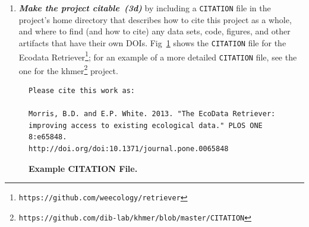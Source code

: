 \documentclass[10pt,letterpaper]{article}
\newcommand{\withurl}[2]{{#1}\footnote{{\texttt{#2}}}}
\newcommand{\practice}[2]{\textbf{\emph{{#2}~({#1})}}}
\begin{document}
\begin{enumerate}
  We recommend Creative Commons licenses for data and text, either
  \withurl{CC-0}{https://creativecommons.org/about/cc0/} (the ``No
  Rights Reserved'' license) or
  \withurl{CC-BY}{https://creativecommons.org/licenses/by/4.0/} (the
  ``Attribution'' license, which sharing and reuse but requires people
  to give appropriate credit to the creators).  For software, we
  recommend a permissive license such as the MIT, BSD, or Apache
  license \cite{laurent2004}.

  \begin{quote}
    \noindent \textbf{What Not To Do}
    \\
    We recommend \emph{against} the ``no commercial use'' variations
    of the Creative Commons licenses because they may impede some
    forms of re-use.  For example, if a researcher in a developing
    country is being paid by her government to compile a public health
    report, she will be unable to include your data if the license says
    ``non-commercial''. We recommend permissive software licenses rather
    than the GNU General Public License (GPL) because it is easier to
    integrate permissively-licensed software into other projects,
    see chapter three in \cite{laurent2004}.
  \end{quote}

\item
  \practice{3d}{Make the project citable} by including a
  \texttt{CITATION} file in the project's home directory that
  describes how to cite this project as a whole, and where to find (and how to cite)
  any data sets, code, figures, and other artifacts
  that have their own DOIs.  Fig~\ref{fig:citation} shows the
  \texttt{CITATION} file for the \withurl{Ecodata
    Retriever}{https://github.com/weecology/retriever}; for an example
  of a more detailed \texttt{CITATION} file, see the one for the
  \withurl{khmer}{https://github.com/dib-lab/khmer/blob/master/CITATION}
  project.

\end{enumerate}

\begin{figure}
\caption{\textbf{Example CITATION File.}}
{\small
\begin{verbatim}
Please cite this work as:

Morris, B.D. and E.P. White. 2013. "The EcoData Retriever:
improving access to existing ecological data." PLOS ONE 8:e65848.
http://doi.org/doi:10.1371/journal.pone.0065848
\end{verbatim}
}
\label{fig:citation}
\end{figure}
\end{document}
